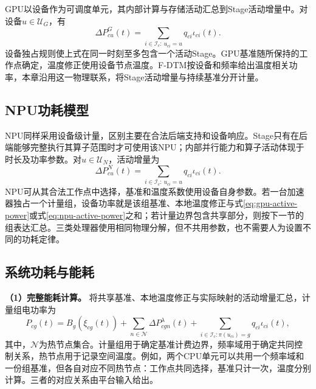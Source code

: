 GPU以设备作为可调度单元，其内部计算与存储活动汇总到Stage活动增量中。对设备\(u\in\mathcal U_G\)，有
\begin{equation}
\Delta P^{G}_{cu}(t)=
\sum_{i\in\mathcal I_c:\,u_{ci}=u}q_{ci}\iota_{ci}(t).
\label{eq:gpu-active-power}
\end{equation}
设备独占规则使上式在同一时刻至多包含一个活动Stage。GPU基准随所保持的工作点确定，温度修正使用设备节点温度。F-DTM按设备和频率给出温度相关功率\cite{fdtm2022}，本章沿用这一物理联系，将Stage活动增量与持续基准分开计量。

\subsection{NPU功耗模型}

NPU同样采用设备级计量，区别主要在合法后端支持和设备响应。Stage只有在后端能够完整执行其算子范围时才可使用该NPU；内部并行能力和算子活动体现于时长及功率参数。对\(u\in\mathcal U_N\)，活动增量为
\begin{equation}
\Delta P^{N}_{cu}(t)=
\sum_{i\in\mathcal I_c:\,u_{ci}=u}q_{ci}\iota_{ci}(t).
\label{eq:npu-active-power}
\end{equation}
NPU可从其合法工作点中选择，基准和温度系数使用设备自身参数。若一台加速器独占一个计量组，设备功率就是该组基准、本地温度修正与式\eqref{eq:gpu-active-power}或式\eqref{eq:npu-active-power}之和；若计量边界包含共享部分，则按下一节的组表达汇总。三类处理器使用相同物理分解，但不共用参数，也不需要人为设置不同的功耗定律。

\subsection{系统功耗与能耗}

\textbf{（1）完整能耗计算。}
将共享基准、本地温度修正与实际映射的活动增量汇总，计量组电功率为
\begin{equation}
P_{cg}(t)=B_g(\xi_{cg}(t))
+\sum_{n\in\mathcal N}\Delta P^\lambda_{cgn}(t)
+\sum_{i\in\mathcal I_c:\pi(u_{ci})=g}q_{ci}\iota_{ci}(t),
\label{eq:group-electric-power}
\end{equation}
其中，\(\mathcal N\)为热节点集合。计量组用于确定基准计费边界，频率域用于确定共同控制关系，热节点用于记录空间温度。例如，两个CPU单元可以共用一个频率域和一份组基准，但各自对应不同热节点：工作点共同选择，基准只计一次，温度分别计算。三者的对应关系由平台输入给出。

